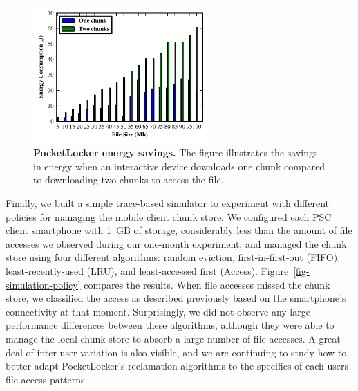 \begin{figure}
  
  \vspace*{-0.1in}

  \includegraphics[width=0.6\textwidth]{./figures/energysavings.pdf}

  \caption{\small \textbf{PocketLocker energy savings.} The figure
    illustrates the savings in energy when an interactive device downloads
  one chunk compared to downloading two chunks to access the file.}
  
  \vspace*{-0.1in}

  \label{fig-evaluation-energysavings}
  
  \vspace*{-0.2in}

\end{figure}

Finally, we built a simple trace-based simulator to experiment with different
policies for managing the mobile client chunk store. We configured each PSC
client smartphone with 1~GB of storage, considerably less than the amount of
file accesses we observed during our one-month experiment, and managed the
chunk store using four different algorithms: random eviction,
first-in-first-out (FIFO), least-recently-used (LRU), and least-accessed
first (Access). Figure~\ref{fig-simulation-policy} compares the results. When
file accesses missed the chunk store, we classified the access as described
previously based on the smartphone's connectivity at that moment.
Surprisingly, we did not observe any large performance differences between
these algorithms, although they were able to manage the local
chunk store to absorb a large number of file accesses. A great
deal of inter-user variation is also visible, and we are continuing to study
how to better adapt PocketLocker's reclamation algorithms to the specifics of
each users file access patterns.

